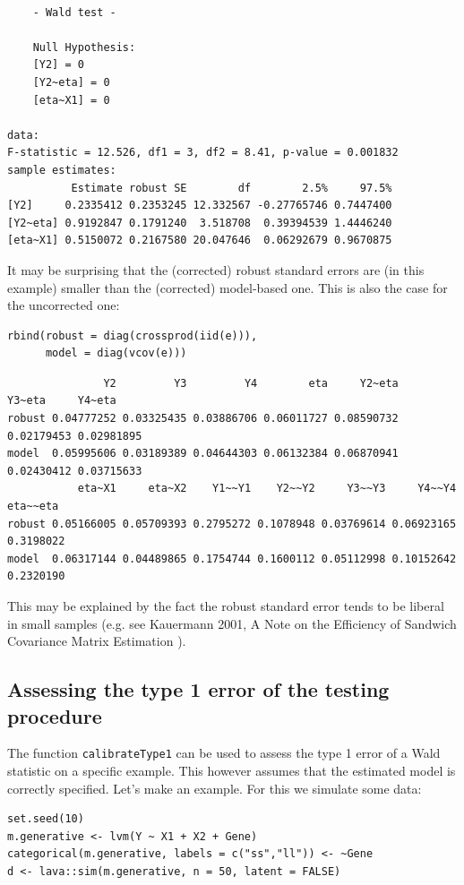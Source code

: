 \documentclass[12pt]{article}
\begin{document}
\begin{verbatim}

	- Wald test -

	Null Hypothesis:
	[Y2] = 0
	[Y2~eta] = 0
	[eta~X1] = 0

data:  
F-statistic = 12.526, df1 = 3, df2 = 8.41, p-value = 0.001832
sample estimates:
          Estimate robust SE        df        2.5%     97.5%
[Y2]     0.2335412 0.2353245 12.332567 -0.27765746 0.7447400
[Y2~eta] 0.9192847 0.1791240  3.518708  0.39394539 1.4446240
[eta~X1] 0.5150072 0.2167580 20.047646  0.06292679 0.9670875
\end{verbatim}

It may be surprising that the (corrected) robust standard errors are
(in this example) smaller than the (corrected) model-based one. This
is also the case for the uncorrected one:
\lstset{language=r,label= ,caption= ,captionpos=b,numbers=none}
\begin{lstlisting}
rbind(robust = diag(crossprod(iid(e))),
      model = diag(vcov(e)))
\end{lstlisting}

\begin{verbatim}
               Y2         Y3         Y4        eta     Y2~eta     Y3~eta     Y4~eta
robust 0.04777252 0.03325435 0.03886706 0.06011727 0.08590732 0.02179453 0.02981895
model  0.05995606 0.03189389 0.04644303 0.06132384 0.06870941 0.02430412 0.03715633
           eta~X1     eta~X2    Y1~~Y1    Y2~~Y2     Y3~~Y3     Y4~~Y4  eta~~eta
robust 0.05166005 0.05709393 0.2795272 0.1078948 0.03769614 0.06923165 0.3198022
model  0.06317144 0.04489865 0.1754744 0.1600112 0.05112998 0.10152642 0.2320190
\end{verbatim}


This may be explained by the fact the robust standard error tends to
be liberal in small samples (e.g. see Kauermann 2001, A Note on the
Efficiency of Sandwich Covariance Matrix Estimation ).

\subsection{Assessing the type 1 error of the testing procedure}
\label{sec:org2f34c32}

The function \texttt{calibrateType1} can be used to assess the type 1 error
of a Wald statistic on a specific example. This however assumes that
the estimated model is correctly specified. Let's make an example. For
this we simulate some data:
\lstset{language=r,label= ,caption= ,captionpos=b,numbers=none}
\begin{lstlisting}
set.seed(10)
m.generative <- lvm(Y ~ X1 + X2 + Gene)
categorical(m.generative, labels = c("ss","ll")) <- ~Gene
d <- lava::sim(m.generative, n = 50, latent = FALSE)
\end{lstlisting}
\end{document}
